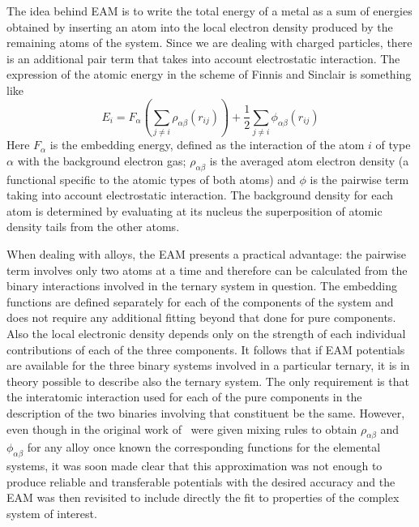 The idea behind EAM is to write the total energy of a metal as a sum of energies obtained by inserting an atom into the local electron density produced by the remaining atoms of the system. Since we are dealing with charged particles, there is an additional pair term that takes into account electrostatic interaction. The expression of the atomic energy in the scheme of Finnis and Sinclair is something like
\begin{equation}
    \label{eqn:EAM1}
    E_i= F_\alpha\left(\sum_{j\neq i} \rho_{\alpha\beta} (r_{ij}) \right) + \frac{1}{2} \sum_{j\neq i} \phi_{\alpha\beta}(r_{ij})
\end{equation}
Here $F_\alpha$ is the embedding energy, defined as the interaction of the atom $i$ of type $\alpha$ with the background electron gas; $\rho_{\alpha\beta}$ is the averaged atom electron density (a functional specific to the atomic types of both atoms) and $\phi$ is the pairwise term taking into account electrostatic interaction. The background density for each atom is determined by evaluating at its nucleus the superposition of atomic density tails from the other atoms.

When dealing with alloys, the EAM presents a practical advantage: the pairwise term involves only two atoms at a time and therefore can be calculated from the binary interactions involved in the ternary system in question. The embedding functions are defined separately for each of the components of the system and does not require any additional fitting beyond that done for pure components. Also the local electronic density depends only on the strength of each individual contributions of each of the three components. It follows that if EAM potentials are available for the three binary systems involved in a particular ternary, it is in theory possible to describe also the ternary system. The only requirement is that the interatomic interaction used for each of the pure components in the description of the two binaries involving that constituent be the same. However, even though in the original work of~\textcite{Daw1984EAM} were given mixing rules to obtain $\rho_{\alpha\beta}$ and $\phi_{\alpha\beta}$ for any alloy once known the corresponding functions for the elemental systems, it was soon made clear that this approximation was not enough to produce reliable and transferable potentials with the desired accuracy and the EAM was then revisited to include directly the fit to properties of the complex system of interest.




